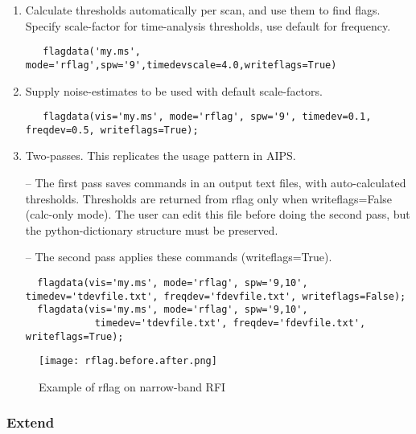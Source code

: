 \begin{enumerate}

\item Calculate thresholds automatically per scan, and use them to find flags.
                             Specify scale-factor for time-analysis thresholds, use default for frequency.

\begin{verbatim}
   flagdata('my.ms', mode='rflag',spw='9',timedevscale=4.0,writeflags=True)
\end{verbatim}
 
\item  Supply noise-estimates to be used with default scale-factors. 
  
\begin{verbatim}
   flagdata(vis='my.ms', mode='rflag', spw='9', timedev=0.1, freqdev=0.5, writeflags=True);
\end{verbatim}

\item Two-passes. This replicates the usage pattern in AIPS.

                             -- The first pass saves commands in an output text files, with auto-calculated thresholds.
                                Thresholds are returned from rflag only when writeflags=False (calc-only mode). 
                                The user can edit this file before doing the second pass, but the python-dictionary 
                                 structure must be preserved.

                             -- The second pass applies these commands (writeflags=True).

\begin{verbatim}
  flagdata(vis='my.ms', mode='rflag', spw='9,10',                                               timedev='tdevfile.txt', freqdev='fdevfile.txt', writeflags=False);
  flagdata(vis='my.ms', mode='rflag', spw='9,10', 
            timedev='tdevfile.txt', freqdev='fdevfile.txt', writeflags=True);
\end{verbatim}
            
\end{enumerate} 


\begin{figure}
\texttt{[image: rflag.before.after.png]}
\caption{Example of rflag on narrow-band RFI}
\end{figure}

\subsubsection{Extend}

